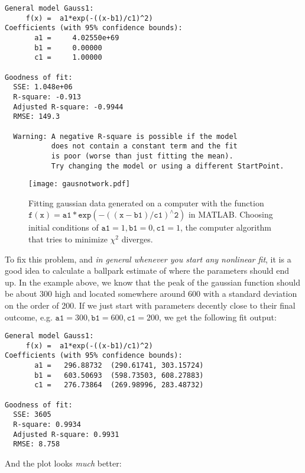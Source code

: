  \begin{framed}
 \begin{verbatim}
General model Gauss1:
     f(x) =  a1*exp(-((x-b1)/c1)^2)
Coefficients (with 95% confidence bounds):
       a1 =     4.02550e+69
       b1 =     0.00000
       c1 =     1.00000

Goodness of fit:
  SSE: 1.048e+06
  R-square: -0.913
  Adjusted R-square: -0.9944
  RMSE: 149.3

  Warning: A negative R-square is possible if the model
           does not contain a constant term and the fit
           is poor (worse than just fitting the mean).
           Try changing the model or using a different StartPoint.
 \end{verbatim}
\end{framed}
\begin{center}
\Large {}

 \begin{figure}[H]
 
 \texttt{[image: gausnotwork.pdf]}
 \caption{Fitting gaussian data generated on a computer with the function $ \mathtt{f(x)} =  \mathtt{a1}*\mathtt{exp}(-((\mathtt{x-b1})/\mathtt{c1})^\wedge \mathtt{ 2})$ in MATLAB. Choosing initial conditions of $\texttt{a1} = 1, \texttt{b1} = 0, \texttt{c1} = 1$, the computer algorithm that tries to minimize $\chi^2$ diverges.}
  \label{gausnotwork}
 \end{figure}
\end{center}
To fix this problem, and{ \it in general whenever you start any nonlinear fit}, it is a good idea to calculate a ballpark estimate of where the parameters should end up. In the example above, we know that the peak of the gaussian function should be about 300 high and located somewhere around 600 with a standard deviation on the order of 200. If we just start with parameters decently close to their final outcome, e.g. $\texttt{a1} = 300, \texttt{b1} = 600, \texttt{c1} = 200$, we get the following fit output:
\begin{framed}
\begin{verbatim}
General model Gauss1:
     f(x) =  a1*exp(-((x-b1)/c1)^2)
Coefficients (with 95% confidence bounds):
       a1 =   296.88732  (290.61741, 303.15724)
       b1 =   603.50693  (598.73503, 608.27883)
       c1 =   276.73864  (269.98996, 283.48732)

Goodness of fit:
  SSE: 3605
  R-square: 0.9934
  Adjusted R-square: 0.9931
  RMSE: 8.758
\end{verbatim}
\end{framed}
And the plot looks \emph{much} better:

